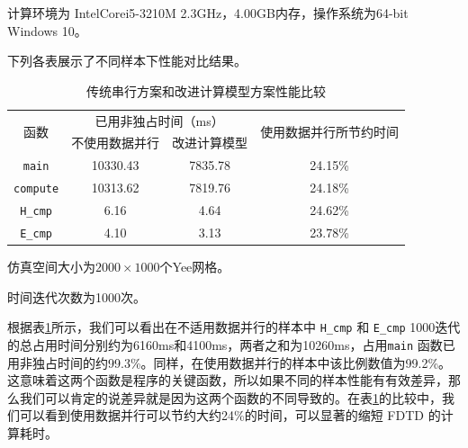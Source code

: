 计算环境为 Intel\textregistered Core\texttrademark i5-3210M 2.3GHz，4.00GB内存，操作系统为64-bit Windows 10。

下列各表展示了不同样本下性能对比结果。

\begin{table}[hp]
\centering
\begin{threeparttable}
	\caption{传统串行方案和改进计算模型方案性能比较}\label{ch3: data parallel or not}
	\begin{tabular}{cccc}
		\toprule
		\multirow{2}{2em}{函数}&\multicolumn{2}{c}{已用非独占时间（ms）} & \multirow{2}{11em}{使用数据并行所节约时间}\\
		\cline{2-3}
		& 不使用数据并行 & 改进计算模型 & \\ 
		
		\midrule
		\lstinline|main| & 10330.43 & 7835.78 & 24.15\% \\ 
		\lstinline|compute| & 10313.62 & 7819.76 & 24.18\%\\ 
		\lstinline|H_cmp|& 6.16 & 4.64 & 24.62\%\\ 
		\lstinline|E_cmp|& 4.10 & 3.13 &23.78\% \\
		\bottomrule
	\end{tabular} 
	\begin{tablenotes}
		\item[1] 仿真空间大小为$2000\times1000$个Yee网格。
		\item[2] 时间迭代次数为1000次。
	\end{tablenotes}
\end{threeparttable}
\end{table}

根据表\ref{ch3: data parallel or not}所示，我们可以看出在不适用数据并行的样本中 \lstinline|H_cmp| 和 \lstinline|E_cmp| 1000迭代的总占用时间分别约为6160ms和4100ms，两者之和为10260ms，占用\linebreak[4] \lstinline|main| 函数已用非独占时间的约99.3\%。同样，在使用数据并行的样本中该比例数值为99.2\%。这意味着这两个函数是程序的关键函数，所以如果不同的样本性能有有效差异，那么我们可以肯定的说差异就是因为这两个函数的不同导致的。在表\ref{ch3: data parallel or not}的比较中，我们可以看到使用数据并行可以节约大约24\%的时间，可以显著的缩短 FDTD 的计算耗时。

